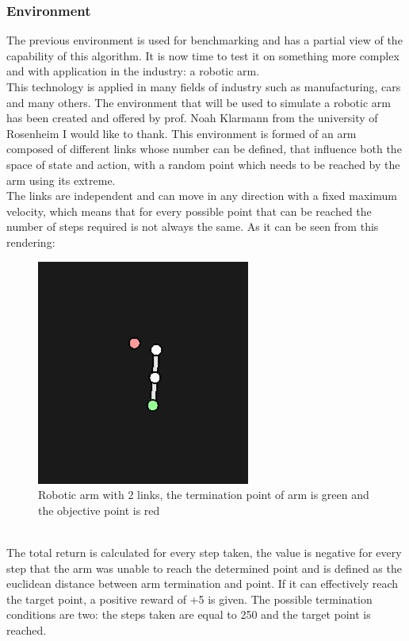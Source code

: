 \subsubsection{Environment}
The previous environment is used for benchmarking and has a partial view of the capability of this algorithm. It is now time to test it on something more complex and with application in the industry: a robotic arm. \\
This technology is applied in many fields of industry such as manufacturing, cars and many others. The environment that will be used to simulate a robotic arm has been created and offered by prof. Noah Klarmann from the university of Rosenheim I would like to thank. This environment is formed of an arm composed of different links whose number can be defined, that influence both the space of state and action, with a random point which needs to be reached by the arm using its extreme.\\
The links are independent and can move in any direction with a fixed maximum velocity, which means that for every possible point that can be reached the number of steps required is not always the same. As it can be seen from this rendering:
\begin{figure}[h]
	\centering
	\includegraphics[width=0.45\linewidth]{img/quantum_robotic_arm_SAC_4182}
	\caption{Robotic arm with 2 links, the termination point of arm is green and the objective point is red}
	\label{fig:roboticarmsac}
\end{figure}\\
The total return is calculated for every step taken, the value is negative for every step that the arm was unable to reach the determined point and is defined as the euclidean distance between arm termination and point. If it can effectively reach the target point, a positive reward of +5 is given. The possible termination conditions are two: the steps taken are equal to 250 and the target point is reached.\\
